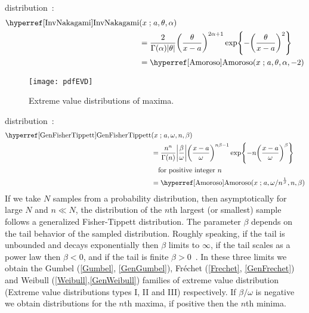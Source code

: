  distribution~\cite{Louzada2018}:
\begin{align}
\label{InvNakagami}
 \opr{InvNakagami}&(x \given a, \theta, \alpha) 
\\ \notag 
& =
 \frac{2}{\Gamma(\alpha) |\theta| }
\Left(\frac{\theta}{x-a}\Right)^{2\alpha+1}
\exp \Left\{
-  \Left(\frac{\theta}{x-a}\Right)^{2}
\Right\}
\\ \notag
& = \opr{Amoroso}(x\given a,\theta, \alpha, -2)
\notag
\end{align}




\label{SecExtremeOrderStatistic}


\begin{figure}[t]
\begin{center}
\texttt{[image: pdfEVD]}
\end{center}
\caption{Extreme value distributions of maxima.}
\end{figure}



 distribution~\cite{Smirnov1949,Barndorff-Nielsen1963}:
\begin{align}
\label{GenFisherTippett}  
 \opr{GenFisherTippett}&(x\given  a, \omega, n, \beta) 
\notag
\\ \notag
&=
\frac{n^n}{\Gamma(n)} 
\Left|\frac{\beta}{\omega}\Right|
\Left(\frac{x-a}{\omega}\Right)^{n \beta -1}
\exp \Left\{
-  n \Left(\frac{x-a}{\omega}\Right)^{\beta}
\Right\} \checked
\\
& \quad \text{for positive integer } n
\\ \notag
& = \opr{Amoroso}(x\given a,{\omega}/{n^{\frac{1}{\beta} }},n,\beta) \checked
\end{align}
If we take $N$ samples from a probability distribution, then asymptotically for large $N$ and $n\ll N$, the distribution of the $n$th largest (or smallest) sample follows a generalized Fisher-Tippett distribution. The parameter $\beta$ depends on the tail behavior of the sampled distribution. Roughly speaking, if the tail is unbounded and decays exponentially then $\beta$ limits to $\infty$, if the tail scales as a power law then $\beta<0$,  and if the tail is finite $\beta>0$~\cite{Gumbel1958}. In these three limits we obtain the Gumbel (\ref{Gumbel}, \ref{GenGumbel}), Fr\'{e}chet (\ref{Frechet}, \ref{GenFrechet}) and Weibull (\ref{Weibull},\ref{GenWeibull}) families of extreme value distribution (Extreme value distributions types I, II and III) respectively. If $\beta/\omega$ is negative we obtain distributions for the $n$th maxima, if positive then the $n$th minima.

